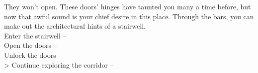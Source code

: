 They won’t open. These doors’ hinges have taunted you many a time before, but now that awful sound is your chief desire in this place. Through the bars, you can make out the architectural hints of a stairwell.\\

 Enter the stairwell -- \\
 Open the doors -- \\
 Unlock the doors --  \\
> Continue exploring the corridor -- 